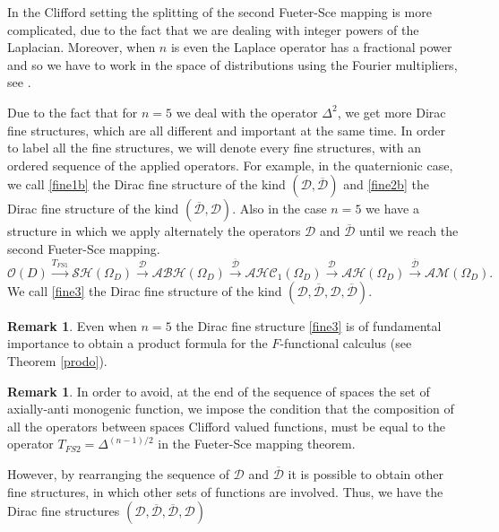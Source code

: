 \documentclass[reqno,11pt]{amsart}
\numberwithin{equation}{section}
\theoremstyle{definition}
\newtheorem{remark}[theorem]{{\bf Remark}}
\begin{document}
\medskip
In the Clifford setting the splitting of the second Fueter-Sce mapping is more complicated, due to the fact that we are dealing with integer powers of the Laplacian.
Moreover, when $n$ is even the Laplace operator has a fractional power
and so we have to work in the space of distributions using the Fourier multipliers, see \cite{Q1}.


\medskip
Due to the fact that for $n=5$ we deal with the operator $ \Delta^2$, we get more Dirac fine structures, which are all different and important at the same time. In order to label all the fine structures, we will denote every fine structures, with an ordered sequence of the applied operators. For example, in the quaternionic case, we call \eqref{fine1b} the Dirac fine structure of the kind $(\mathcal{D}, \mathcal{\overline{D}})$ and \eqref{fine2b} the Dirac fine structure of the kind $(\mathcal{\overline{D}}, \mathcal{D})$.
Also in the case $n=5$ we have a structure in which we apply alternately the operators $ \mathcal{D}$ and $ \mathcal{\overline{D}}$ until we reach the second Fueter-Sce mapping.
\begin{equation}
\label{fine3}
\mathcal{O}(D) \overset{T_{FS1}}{\longrightarrow} \mathcal{SH}(\Omega_D)\overset{\mathcal{D}}{\longrightarrow} \mathcal{ABH}(\Omega_D)\overset{\mathcal{\overline{D}}}{\longrightarrow}\mathcal{AHC}_1(\Omega_D) \overset{\mathcal{D}}{\longrightarrow} \mathcal{AH}(\Omega_D) \overset{\mathcal{\overline{D}}}{\longrightarrow} \mathcal{AM}(\Omega_D).
\end{equation}
We call \eqref{fine3} the Dirac fine structure of the kind $(\mathcal{D}, \mathcal{\overline{D}}, \mathcal{D}, \mathcal{\overline{D}} )$.
\begin{remark}
Even when $n=5$  the Dirac fine structure \eqref{fine3} is of fundamental importance to obtain a product formula for the $F$-functional calculus (see Theorem \ref{prodo}).
\end{remark}
\begin{remark}
In order to avoid, at the end of the sequence of spaces the set of axially-anti monogenic function, we impose the condition that the composition of all the operators between spaces Clifford valued functions, must be equal to the operator $T_{FS2}=\Delta^{(n-1)/2} $ in the Fueter-Sce mapping theorem.
\end{remark}
 However, by rearranging the sequence of $ \mathcal{D}$ and $ \mathcal{\overline{D}}$ it is possible to obtain other fine structures, in which other sets of functions are involved. Thus, we have the Dirac fine structures $(\mathcal{D}, \mathcal{\overline{D}},\mathcal{\overline{D}}, \mathcal{D} )$
\end{document}
